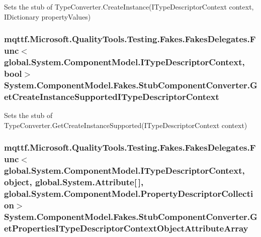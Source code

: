Sets the stub of Type\-Converter.\-Create\-Instance(\-I\-Type\-Descriptor\-Context context, I\-Dictionary property\-Values)

\hypertarget{class_system_1_1_component_model_1_1_fakes_1_1_stub_component_converter_a1c120239cad7da26588b9476923fecfe}{
\subsubsection[{Get\-Create\-Instance\-Supported\-I\-Type\-Descriptor\-Context}]{\setlength{\rightskip}{0pt plus 5cm}mqttf.\-Microsoft.\-Quality\-Tools.\-Testing.\-Fakes.\-Fakes\-Delegates.\-Func$<$global.\-System.\-Component\-Model.\-I\-Type\-Descriptor\-Context, bool$>$ System.\-Component\-Model.\-Fakes.\-Stub\-Component\-Converter.\-Get\-Create\-Instance\-Supported\-I\-Type\-Descriptor\-Context}}\label{class_system_1_1_component_model_1_1_fakes_1_1_stub_component_converter_a1c120239cad7da26588b9476923fecfe}


Sets the stub of Type\-Converter.\-Get\-Create\-Instance\-Supported(\-I\-Type\-Descriptor\-Context context)

\hypertarget{class_system_1_1_component_model_1_1_fakes_1_1_stub_component_converter_aa381d6dd410bafa26d5ecea9d54a9bea}{
\subsubsection[{Get\-Properties\-I\-Type\-Descriptor\-Context\-Object\-Attribute\-Array}]{\setlength{\rightskip}{0pt plus 5cm}mqttf.\-Microsoft.\-Quality\-Tools.\-Testing.\-Fakes.\-Fakes\-Delegates.\-Func$<$global.\-System.\-Component\-Model.\-I\-Type\-Descriptor\-Context, object, global.\-System.\-Attribute\mbox{[}$\,$\mbox{]}, global.\-System.\-Component\-Model.\-Property\-Descriptor\-Collection$>$ System.\-Component\-Model.\-Fakes.\-Stub\-Component\-Converter.\-Get\-Properties\-I\-Type\-Descriptor\-Context\-Object\-Attribute\-Array}}\label{class_system_1_1_component_model_1_1_fakes_1_1_stub_component_converter_aa381d6dd410bafa26d5ecea9d54a9bea}


